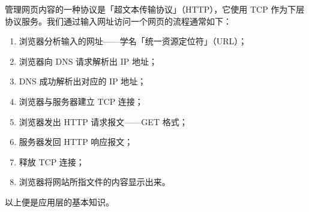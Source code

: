 \documentclass[UTF8]{ctexart}
\newcommand\Concept[1]{\textcolor{cyan!70!black}{#1}}
\begin{document}
管理网页内容的一种协议是\Concept{「超文本传输协议」（HTTP）}，它使用 TCP 作为下层协议服务。我们通过输入网址访问一个网页的流程通常如下：
\begin{enumerate}[itemsep=0pt,parsep=0pt]
  \item 浏览器分析输入的网址——学名\Concept{「统一资源定位符」（URL）}；
  \item 浏览器向 DNS 请求解析出 IP 地址；
  \item DNS 成功解析出对应的 IP 地址；
  \item 浏览器与服务器建立 TCP 连接；
  \item 浏览器发出 HTTP 请求报文——GET 格式；
  \item 服务器发回 HTTP 响应报文；
  \item 释放 TCP 连接；
  \item 浏览器将网站所指文件的内容显示出来。
\end{enumerate}

以上便是应用层的基本知识。

\BgThispage
\end{document}
